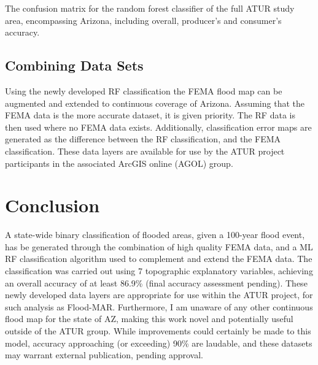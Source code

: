 \documentclass[
]{agujournal2019}
\begin{document}
\begin{table}

\caption{\label{tbl-confusion3}The confusion matrix for the random
forest classifier of the full ATUR study area, encompassing Arizona,
including overall, producer's and consumer's accuracy.}


\end{table}%

\subsection{Combining Data Sets}\label{combining-data-sets}

Using the newly developed RF classification the FEMA flood map can be
augmented and extended to continuous coverage of Arizona. Assuming that
the FEMA data is the more accurate dataset, it is given priority. The RF
data is then used where no FEMA data exists. Additionally,
classification error maps are generated as the difference between the RF
classification, and the FEMA classification. These data layers are
available for use by the ATUR project participants in the associated
ArcGIS online (AGOL) group.

\section{Conclusion}\label{conclusion}

A state-wide binary classification of flooded areas, given a 100-year
flood event, has be generated through the combination of high quality
FEMA data, and a ML RF classification algorithm used to complement and
extend the FEMA data. The classification was carried out using 7
topographic explanatory variables, achieving an overall accuracy of at
least 86.9\% (final accuracy assessment pending). These newly developed
data layers are appropriate for use within the ATUR project, for such
analysis as Flood-MAR. Furthermore, I am unaware of any other continuous
flood map for the state of AZ, making this work novel and potentially
useful outside of the ATUR group. While improvements could certainly be
made to this model, accuracy approaching (or exceeding) 90\% are
laudable, and these datasets may warrant external publication, pending
approval.
\end{document}
